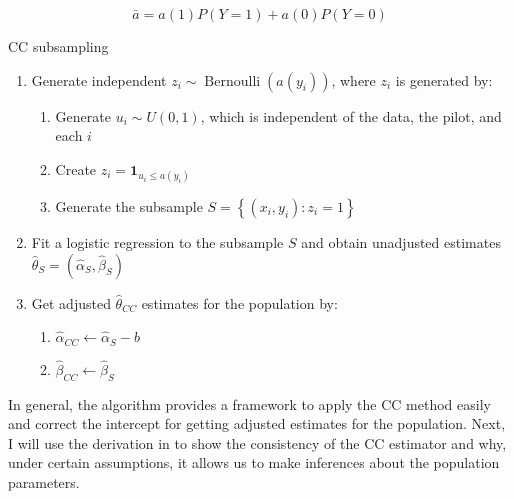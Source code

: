 \begin{equation}
    \nonumber \bar{a}=a(1) P(Y=1)+a(0) P(Y=0)
    \label{eqn:a_bar}
\end{equation}

\begin{algorithm}[ht]
  \caption{CC subsampling}
  \begin{enumerate}
    \item 
    Generate independent $z_i \sim \operatorname{Bernoulli}\left(a\left(y_i\right)\right)$, where $z_i$ is generated by:
    \begin{enumerate}
      \item 
      Generate $u_i \sim U(0,1)$, which is independent of the data, the pilot, and each $i$
      \item 
      Create $z_i=\mathbf{1}_{u_i \leq a\left(y_i\right)}$
      \item Generate the subsample $S=\left\{\left(x_i, y_i\right): z_i=1\right\}$ 
    \end{enumerate}
    \item 
    Fit a logistic regression to the subsample $S$ and obtain unadjusted estimates $\hat{\theta}_{S}=(\hat{\alpha}_{S}, \hat{\beta}_{S})$
    \item
    Get adjusted $\widehat{\theta}_{CC}$ estimates for the population by:
    \begin{enumerate}
        \item $\hat{\alpha}_{CC} \leftarrow \hat{\alpha}_{S}-b$
        \item $\hat{\beta}_{CC} \leftarrow \hat{\beta}_{S}$
    \end{enumerate}
  \end{enumerate}
  \label{alg:alg_cc}
\end{algorithm}

In general, the algorithm provides a framework to apply the CC method easily and correct the intercept for getting adjusted estimates for the population. Next, I will use the derivation in \textcite{king2001logistic} to show the consistency of the CC estimator and why, under certain assumptions, it allows us to make inferences about the population parameters. 



